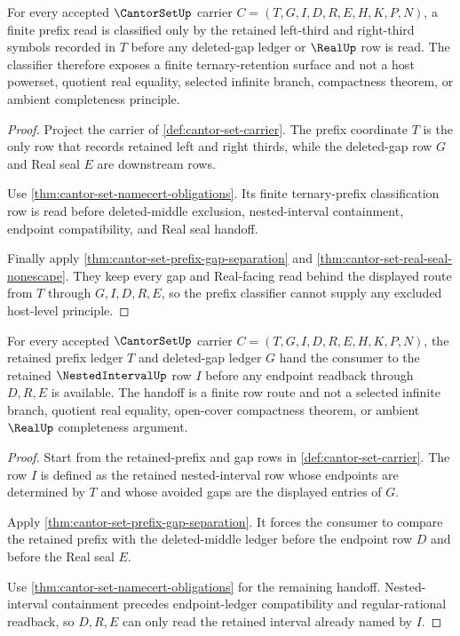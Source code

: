 \begin{theorem}
\label{thm:cantor-set-ternary-prefix-classifier}
For every accepted $\CantorSetUp$ carrier $C=(T,G,I,D,R,E,H,K,P,N)$, a finite prefix read is classified only by the retained left-third and right-third symbols recorded in $T$ before any deleted-gap ledger or $\RealUp$ row is read. The classifier therefore exposes a finite ternary-retention surface and not a host powerset, quotient real equality, selected infinite branch, compactness theorem, or ambient completeness principle.
\end{theorem}
\begin{proof}
Project the carrier of \autoref{def:cantor-set-carrier}. The prefix coordinate $T$ is the only row that records retained left and right thirds, while the deleted-gap row $G$ and Real seal $E$ are downstream rows.

Use \autoref{thm:cantor-set-namecert-obligations}. Its finite ternary-prefix classification row is read before deleted-middle exclusion, nested-interval containment, endpoint compatibility, and Real seal handoff.

Finally apply \autoref{thm:cantor-set-prefix-gap-separation} and \autoref{thm:cantor-set-real-seal-nonescape}. They keep every gap and Real-facing read behind the displayed route from $T$ through $G,I,D,R,E$, so the prefix classifier cannot supply any excluded host-level principle.
\end{proof}

\begin{theorem}
\label{thm:cantor-set-nested-interval-handoff}
For every accepted $\CantorSetUp$ carrier $C=(T,G,I,D,R,E,H,K,P,N)$, the retained prefix ledger $T$ and deleted-gap ledger $G$ hand the consumer to the retained $\NestedIntervalUp$ row $I$ before any endpoint readback through $D,R,E$ is available. The handoff is a finite row route and not a selected infinite branch, quotient real equality, open-cover compactness theorem, or ambient $\RealUp$ completeness argument.
\end{theorem}
\begin{proof}
Start from the retained-prefix and gap rows in \autoref{def:cantor-set-carrier}. The row $I$ is defined as the retained nested-interval row whose endpoints are determined by $T$ and whose avoided gaps are the displayed entries of $G$.

Apply \autoref{thm:cantor-set-prefix-gap-separation}. It forces the consumer to compare the retained prefix with the deleted-middle ledger before the endpoint row $D$ and before the Real seal $E$.

Use \autoref{thm:cantor-set-namecert-obligations} for the remaining handoff. Nested-interval containment precedes endpoint-ledger compatibility and regular-rational readback, so $D,R,E$ can only read the retained interval already named by $I$.
\end{proof}

